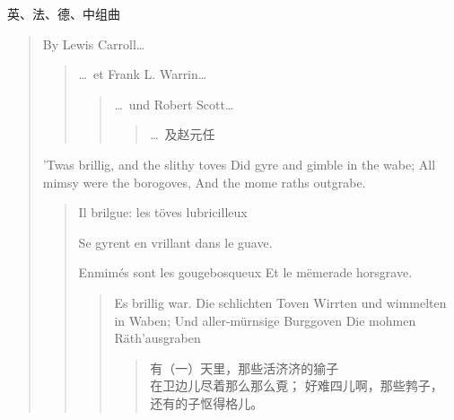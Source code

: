 
\begin{dialog}{英、法、德、中组曲}

\begin{verse}
By Lewis Carroll\ldots

  \begin{verse}
  \ldots\ et Frank L. Warrin\ldots

    \begin{verse}
    \ldots\ und Robert Scott\ldots

      \begin{verse}
      \ldots\ 及赵元任
      \end{verse}
    \end{verse}
  \end{verse}

'Twas brillig, and the slithy toves
Did gyre and gimble in the wabe;
All mimsy were the borogoves,
And the mome raths outgrabe.

  \begin{verse}
  Il brilgue: les töves lubricilleux\par
  Se gyrent en vrillant dans le guave.\par
  Enmimés sont les gougebosqueux
  Et le mëmerade horsgrave.

    \begin{verse}
    Es brillig war. Die schlichten Toven
    Wirrten und wimmelten in Waben;
    Und aller-mürnsige Burggoven
    Die mohmen Räth'ausgraben

      \begin{verse}
      有（一）天里，那些活济济的㺄子\\
      在卫边儿尽着那么那么覔；
      好难四儿啊，那些鹁子，\\
      还有的子怄得格儿。
      \end{verse}
    \end{verse}
  \end{verse}


\end{verse}
\end{dialog}
